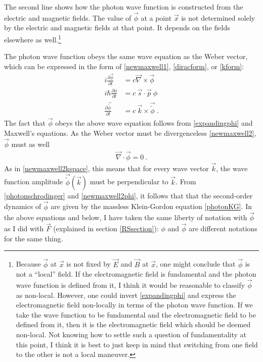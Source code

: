 \documentclass[12pt,secnumarabic,amsmath,amssymb,balancelastpage,nofootinbib]{article}
\newcommand{\del}[0]{\ensuremath{\vec{\nabla}}}
\begin{document}
The second line shows how the photon wave function is constructed from the electric and magnetic fields.  The value of $\vec{\phi}$ at a point $\vec{x}$ is not determined solely by the electric and magnetic fields at that point.  It depends on the fields elsewhere as well.\footnote{Because $\vec{\phi}$ at $\vec{x}$ is not fixed by $\vec{E}$ and $\vec{B}$ at $\vec{x}$, one might conclude that $\vec{\phi}$ is not a ``local'' field.  If the electromagnetic field is fundamental and the photon wave function is defined from it, I think it would be reasonable to classify $\vec{\phi}$ as non-local.  However, one could invert \eqref{expandingphi} and express the electromagnetic field non-locally in terms of the photon wave function.  If we take the wave function to be fundamental and the electromagnetic field to be defined from it, then it is the electromagnetic field which should be deemed non-local.  Not knowing how to settle such a question of fundamentality at this point, I think it is best to just keep in mind that switching from one field to the other is not a local maneuver.}


The photon wave function obeys the same wave equation as the Weber vector, which can be expressed in the form of \eqref{newmaxwell1}, \eqref{diracform}, or \eqref{kform}:
\begin{align}
i\frac{\partial \vec{\phi}}{\partial t}  &= c\del\times\vec{\phi}
\nonumber
\\
i\hbar\frac{\partial \phi}{\partial t}  &= c \: \vec{s}\cdot \vec{p}\: \phi
\nonumber
\\
\frac{\partial \vec{\widetilde{\phi}}}{\partial t} &=c\:\vec{k}\times\vec{\widetilde{\phi}}
\ .
\label{photonschrodinger}
\end{align}
The fact that $\vec{\phi}$ obeys the above wave equation follows from \eqref{expandingphi} and Maxwell's equations.  As the Weber vector must be divergenceless \eqref{newmaxwell2}, $\vec{\phi}$ must as well
\begin{align}
\del\cdot\vec{\phi}=0
\ .
\label{newmaxwell2phi}
\end{align}
As in \eqref{newmaxwell2kspace}, this means that for every wave vector $\vec{k}$, the wave function amplitude $\vec{\widetilde{\phi}}(\vec{k})$ must be perpendicular to $\vec{k}$.  From \eqref{photonschrodinger} and \eqref{newmaxwell2phi}, it follows that that the second-order dynamics of $\vec{\phi}$ are given by the massless Klein-Gordon equation \eqref{photonKG}.  In the above equations and below, I have taken the same liberty of notation with $\vec{\phi}$ as I did with $\vec{F}$ (explained in section \ref{RSsection}): $\phi$ and $\vec{\phi}$ are different notations for the same thing.
\end{document}
